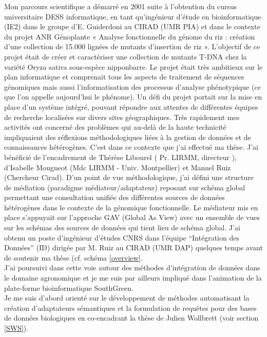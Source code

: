 Mon parcours scientifique a démarré en 2001 suite à l'obtention du cursus universitaire DESS informatique, en tant qu’ingénieur d’étude en bioinformatique (IE2) dans le groupe d’E. Guiderdoni au CIRAD (UMR PIA) et dans le contexte du projet ANR Génoplante « Analyse fonctionnelle du génome du riz : création d'une collection de 15.000 lignées de mutants d'insertion de riz ».  L'objectif de ce projet était de créer et caractériser une collection de mutants T-DNA chez la variété Oryza sativa sous-espèce nipponbarre. Le projet était très ambitieux sur le plan informatique et comprenait tous les aspects de traitement de séquences génomiques mais aussi l’informatisation des processus d’analyse phénotypique (ce que l’on appelle aujourd’hui le phénome). Un défi du projet portait sur la mise en place d’un système intégré, pouvant répondre aux attentes de différentes  équipes de recherche localisées sur divers sites géographiques. Très rapidement mes activités ont concerné des problèmes qui au-delà de la haute technicité impliquaient des réflexions méthodologiques liées à la gestion de données et de connaissances hétérogènes. C’est dans ce contexte que j’ai effectué ma thèse. J’ai bénéficié de l’encadrement  de Thérèse Libourel ( Pr. LIRMM, directeur ), d’Isabelle Mougneot (Mdc LIRMM - Univ. Montpellier) et Manuel Ruiz (Chercheur Cirad). D’un point de vue méthodologique, j’ai défini une structure de médiation (paradigme médiateur/adaptateur) reposant sur schéma global permettant  une consultation unifiée des différentes sources de données hétérogènes dans le contexte de la génomique fonctionnelle. Le médiateur mis en place s’appuyait sur l’approche GAV (Global As View) avec un ensemble de vues sur les schémas des sources de données qui tient lieu de schéma global. J’ai obtenu un poste d’ingénieur d’études CNRS dans l’équipe “Intégration des Données” (ID) dirigée par M. Ruiz au CIRAD (UMR DAP) quelques temps avant de soutenir ma thèse (cf. schéma \ref{overview}. \\

J’ai poursuivi dans cette voie autour des méthodes d’intégration de données dans le domaine agronomique et je me suis par ailleurs impliqué dans l’animation de la plate-forme bioinformatique SouthGreen.  \\
Je me suis d’abord orienté sur le développement de méthodes automatisant la création d’adaptateurs sémantiques et la formulation de requêtes pour des bases de données biologiques en co-encadrant la thèse de Julien Wollbrett (voir section \ref{SWS}).\\

